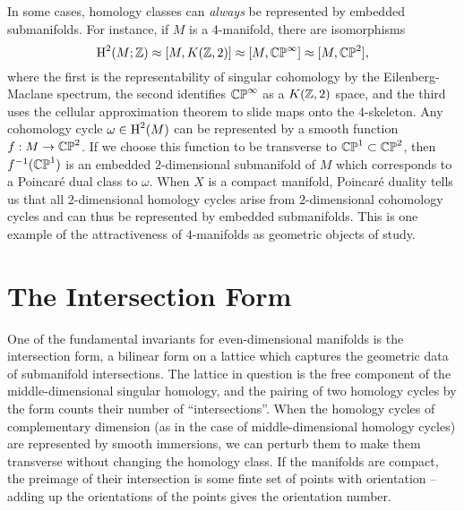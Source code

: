 \begin{remark}
	In some cases, homology classes can \emph{always} be represented by embedded submanifolds. For instance, if $M$ is a $4$-manifold, there are isomorphisms
	\begin{equation}
		\operatorname{H}^2(M; \mathbb{Z}) \approx [M, K(\mathbb{Z},2)] \approx [M, \mathbb{CP}^\infty] \approx [M,\mathbb{CP}^2],
	\end{equation}
	where the first is the representability of singular cohomology by the Eilenberg-Maclane spectrum, the second identifies $\mathbb{CP}^\infty$ as a $K(\mathbb{Z},2)$ space, and the third uses the cellular approximation theorem to slide maps onto the $4$-skeleton. Any cohomology cycle $\omega\in \operatorname{H}^2(M)$ can be represented by a smooth function $f : M \to \mathbb{CP}^2$. If we choose this function to be transverse to $\mathbb{CP}^1\subset \mathbb{CP}^2$, then $f^{-1}(\mathbb{CP}^1)$ is an embedded $2$-dimensional submanifold of $M$ which corresponds to a Poincar\'e dual class to $\omega$. When $X$ is a compact manifold, Poincar\'e duality tells us that all $2$-dimensional homology cycles arise from $2$-dimensional cohomology cycles and can thus be represented by embedded submanifolds. This is one example of the attractiveness of $4$-manifolds as geometric objects of study.
\end{remark}


\section{The Intersection Form}\label{sec:intersection-form}

One of the fundamental invariants for even-dimensional manifolds is the intersection form, a bilinear form on a lattice which captures the geometric data of submanifold intersections. The lattice in question is the free component of the middle-dimensional singular homology, and the pairing of two homology cycles by the form counts their number of ``intersections''. When the homology cycles of complementary dimension (as in the case of middle-dimensional homology cycles) are represented by smooth immersions, we can perturb them to make them transverse without changing the homology class. If the manifolds are compact, the preimage of their intersection is some finte set of points with orientation -- adding up the orientations of the points gives the orientation number.

